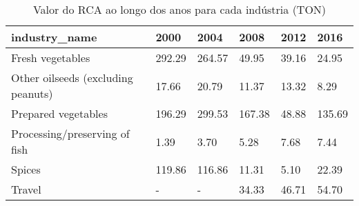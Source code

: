 \begin{table}
\centering
\caption{Valor do RCA ao longo dos anos para cada indústria (TON)}
\begin{tabular}{p{6cm}p{1.5cm}p{1.5cm}p{1.5cm}p{1.5cm}p{1.5cm}}
\toprule
                     industry\_name &   2000 &   2004 &   2008 &  2012 &   2016 \\
\midrule
                  Fresh vegetables & 292.29 & 264.57 &  49.95 & 39.16 &  24.95 \\
Other oilseeds (excluding peanuts) &  17.66 &  20.79 &  11.37 & 13.32 &   8.29 \\
               Prepared vegetables & 196.29 & 299.53 & 167.38 & 48.88 & 135.69 \\
     Processing/preserving of fish &   1.39 &   3.70 &   5.28 &  7.68 &   7.44 \\
                            Spices & 119.86 & 116.86 &  11.31 &  5.10 &  22.39 \\
                            Travel &      - &      - &  34.33 & 46.71 &  54.70 \\
\bottomrule
\end{tabular}
\end{table}
